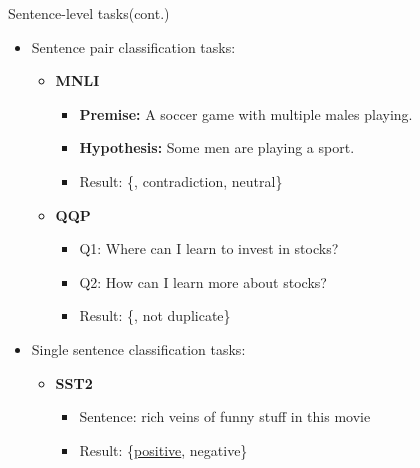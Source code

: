 \documentclass[serif, aspectratio=169]{beamer}
\begin{document}
\begin{frame}{Sentence-level tasks(cont.)}
    \begin{itemize}
        \item Sentence pair classification tasks:
        \begin{itemize}
            \item[] \setlength{\fboxsep}{2pt}\colorbox{yellow!30}{\textbf{MNLI}}
            \begin{itemize}
                \item \textbf{Premise:} A soccer game with multiple males playing.
                \item \textbf{Hypothesis:} Some men are playing a sport.
                \item Result: \{\textcolor{green!50!black}{\underline{}}, contradiction, neutral\}
            \end{itemize}

            \item[] \setlength{\fboxsep}{2pt}\colorbox{yellow!30}{\textbf{QQP}}
            \begin{itemize}
                \item Q1: Where can I learn to invest in stocks?
                \item Q2: How can I learn more about stocks?
                \item Result: \{\textcolor{green!50!black}{\underline{}}, not duplicate\}

            \end{itemize}
        \end{itemize}
        
        \item Single sentence classification tasks:
        
        \begin{itemize}
            \item[] \setlength{\fboxsep}{2pt}\colorbox{yellow!30}{\textbf{SST2}}
            \begin{itemize}
                \item Sentence: rich veins of funny stuff in this movie
                \item Result: \{\textcolor{green!50!black}{\underline{\textcolor{green!50!black}{positive}}}, negative\}

            \end{itemize}
        \end{itemize}
    \end{itemize}
    
\end{frame}
\end{document}
